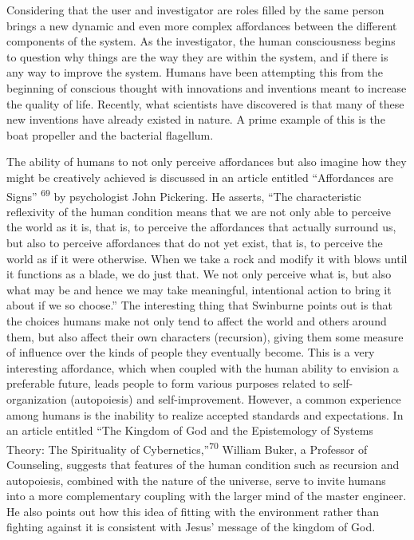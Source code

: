 Considering that the user and investigator are roles filled by the same
person brings a new dynamic and even more complex affordances between
the different components of the system. As the investigator, the human
consciousness begins to question why things are the way they are within
the system, and if there is any way to improve the system. Humans have
been attempting this from the beginning of conscious thought with
innovations and inventions meant to increase the quality of life.
Recently, what scientists have discovered is that many of these new
inventions have already existed in nature. A prime example of this is
the boat propeller and the bacterial flagellum. 


The ability of humans to not only perceive affordances but also imagine
how they might be creatively achieved is discussed in an article
entitled “Affordances are Signs”\textsuperscript{ 69} by psychologist
John Pickering. He asserts, “The characteristic reflexivity of the
human condition means that we are not only able to perceive the world
as it is, that is, to perceive the affordances that actually surround
us, but also to perceive affordances that do not yet exist, that is, to
perceive the world as if it were otherwise. When we take a rock and
modify it with blows until it functions as a blade, we do just that. We
not only perceive what is, but also what may be and hence we may take
meaningful, intentional action to bring it about if we so choose.” The
interesting thing that Swinburne points out is that the choices humans
make not only tend to affect the world and others around them, but also
affect their own characters (recursion), giving them some measure of
influence over the kinds of people they eventually become. This is a
very interesting affordance, which when coupled with the human ability
to envision a preferable future, leads people to form various purposes
related to self-organization (autopoiesis) and self-improvement.
However, a common experience among humans is the inability to realize
accepted standards and expectations. In an article entitled “The
Kingdom of God and the Epistemology of Systems Theory: The Spirituality
of Cybernetics,”\textsuperscript{70} William Buker, a Professor of
Counseling, suggests that features of the human condition such as
recursion and autopoiesis, combined with the nature of the universe,
serve to invite humans into a more complementary coupling with the
larger mind of the master engineer. He also points out how this idea of
fitting with the environment rather than fighting against it is
consistent with Jesus’ message of the kingdom of God.


